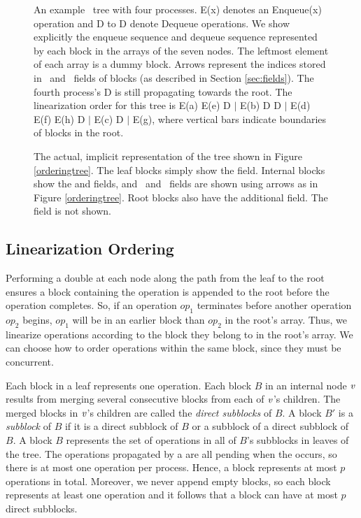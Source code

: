 \begin{figure*}[t]

\caption{An example \ordering\ tree with four processes. 
E(x) denotes an Enqueue(x) operation and D to D denote Dequeue operations.
We show explicitly the enqueue sequence and dequeue sequence represented by each block in the  arrays of the seven nodes.  The leftmost element of each  array is a dummy block.
Arrows represent the indices stored in \eleft\ and \eright\ fields of blocks (as described in Section \ref{sec:fields}).
The fourth process's D is still propagating towards the root.
The linearization order for this tree is
E(a) E(e) D $\mid$ E(b) D D $\mid$ E(d) E(f) E(h) D $\mid$ E(c) D $\mid$ E(g), where vertical bars indicate boundaries of blocks in the root.\label{orderingtree}}
\medskip

\caption{\label{implicit}The actual, implicit representation of the tree shown in Figure \ref{orderingtree}.
The leaf blocks simply show the  field.
Internal blocks show the  and  fields,
and \eleft\ and \eright\ fields are shown using arrows as in Figure \ref{orderingtree}.
Root blocks also have the additional  field.
The  field is not shown.}
\end{figure*}

\subsection{Linearization Ordering}

Performing a double  at each node along the path from the leaf to the root ensures 
a block containing the operation is appended to the root before the operation completes.
So, if an operation $op_1$ terminates before another operation $op_2$ begins, 
$op_1$ will be in an earlier block than $op_2$ in the root's  array.
Thus, we linearize operations according to the block they belong to in the root's array.
We can choose how to order operations within the same block, since they must be concurrent.

Each block in a leaf represents one operation.
Each block $B$ in an internal node $\mbox{\textnormal{\textit{v}}}$ results from merging
several consecutive blocks from each of $\mbox{\textnormal{\textit{v}}}$'s children.
The merged blocks in $\mbox{\textnormal{\textit{v}}}$'s children are called the \emph{direct subblocks} of $B$.
A block $B'$ is a \emph{subblock} of $B$ if it is a direct subblock of $B$
or a subblock of a direct subblock of $B$.
A block $B$ represents the set of operations in all of $B$'s subblocks in leaves of the tree.
The operations propagated by a  are all pending when the  occurs,
so there is at most one operation per process.
Hence, a block represents at most $p$ operations in total.  
Moreover, we never append empty blocks, so 
each block represents at least one operation and it follows that a block can have at most $p$ direct subblocks.

